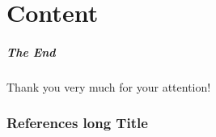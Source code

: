 \part{Content}












\begin{frame}
	\frametitle{The End}
	\centering
	Thank you very much for your attention!
\end{frame}


\appendix
\section[References]{References long Title}
\begin{frame}
        \footnotesize
	\printbibliography

\end{frame}



